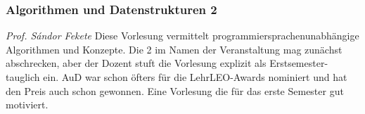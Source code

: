 
\subsubsection{Algorithmen und Datenstrukturen 2}
	\textit{Prof. S\'andor Fekete}
	Diese Vorlesung vermittelt programmiersprachenunabhängige Algorithmen und Konzepte. Die \glqq{}2\grqq{} im Namen der Veranstaltung mag zunächst abschrecken, aber der Dozent stuft die Vorlesung explizit als Erstsemester-tauglich ein. AuD war schon öfters für die LehrLEO-Awards nominiert und hat den Preis auch schon gewonnen. Eine Vorlesung die für das erste Semester gut motiviert.